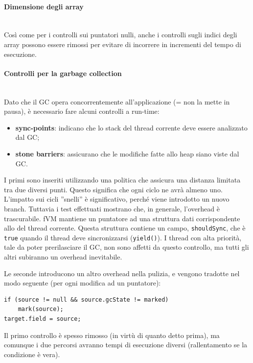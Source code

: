 \paragraph{Dimensione degli array} \mbox{} \\
Così come per i controlli sui puntatori nulli, anche i controlli sugli indici degli array possono essere rimossi per evitare di incorrere in incrementi del tempo di esecuzione.

\paragraph{Controlli per la garbage collection} \mbox{} \\
Dato che il GC opera concorrentemente all'applicazione (= non la mette in pausa), è necessario fare alcuni controlli a run-time:
\begin{itemize}
	\item \textbf{sync-points}: indicano che lo stack del thread corrente deve essere analizzato dal GC;
	\item \textbf{stone barriers}: assicurano che le modifiche fatte allo heap siano viste dal GC.
\end{itemize}
I primi sono inseriti utilizzando una politica che assicura una distanza limitata tra due diversi punti. Questo significa che ogni ciclo ne avrà almeno uno. L'impatto sui cicli ''snelli'' è significativo, perché viene introdotto un nuovo branch. Tuttavia i test effettuati mostrano che, in generale, l'overhead è trascurabile. fVM mantiene un puntatore ad una struttura dati corrispondente allo del thread corrente. Questa struttura contiene un campo, \texttt{shouldSync}, che è \texttt{true} quando il thread deve sincronizzarsi (\texttt{yield()}). I thread con alta priorità, tale da poter prerilasciare il GC, non sono affetti da questo controllo, ma tutti gli altri subiranno un overhead inevitabile. 

Le seconde introducono un altro overhead nella pulizia, e vengono tradotte nel modo seguente (per ogni modifica ad un puntatore):
\begin{lstlisting}[caption={Stone-barrier},label={lst:stone}]
if (source != null && source.gcState != marked)
	mark(source);
target.field = source;
\end{lstlisting}
Il primo controllo è spesso rimosso (in virtù di quanto detto prima), ma comunque i due percorsi avranno tempi di esecuzione diversi (rallentamento se la condizione è vera).

